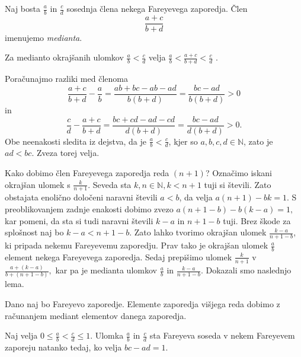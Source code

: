 \documentclass[mat1]{fmfdelo}
\begin{document}
%
\begin{definicija}
Naj bosta $\frac{a}{b}$ in $\frac{c}{d}$ sosednja člena nekega Fareyevega zaporedja. Člen \[\frac{a+c}{b+d} \] imenujemo \emph{medianta}.
\end{definicija}

\begin{trditev}
Za medianto okrajšanih ulomkov \(\frac{a}{b} < \frac{c}{d}\) velja  \(\frac{a}{b} < \frac{a+c}{b+d} < \frac{c}{d}\) .
\end{trditev}

\begin{dokaz}
Poračunajmo razliki med členoma
\[\frac{a+c}{b+d} - \frac{a}{b} = \frac{ab+bc-ab-ad}{b(b+d)} = \frac{bc-ad}{b(b+d)} > 0\] in
\[\frac{c}{d} - \frac{a+c}{b+d} = \frac{bc+cd-ad-cd}{d(b+d)} = \frac{bc-ad}{d(b+d)} > 0.\]
Obe neenakosti sledita iz dejstva, da je \(\frac{a}{b} < \frac{c}{d}\), kjer so \(a, b, c, d \in \mathbb{N} \), zato je \( ad < bc.\)
Zveza torej velja. 
\end{dokaz}

%
Kako dobimo člen Fareyevega zaporedja reda $(n+1)$?
Označimo iskani okrajšan ulomek s $\frac{k}{n+1}$. Seveda sta $k, n \in\mathbb{N}, k < n+1$ tuji si števili. Zato obstajata enolično določeni naravni števili $a < b$, da velja $a(n+1)-bk=1.$ S preoblikovanjem zadnje enakosti dobimo zvezo $a(n+1-b)-b(k-a)=1,$ kar pomeni, da sta si tudi naravni števili $k-a$ in $n+1-b$ tuji. Brez škode za splošnost naj bo $k-a<n+1-b.$ Zato lahko tvorimo okrajšan ulomek $\frac{k-a}{n+1-b}$, ki pripada nekemu Fareyevemu zaporedju. Prav tako je okrajšan ulomek $\frac{a}{b}$ element nekega Fareyevega zaporedja. Sedaj prepišimo ulomek $\frac{k}{n+1}$ v $\frac{a+(k-a)}{b+(n+1-b)},$ kar pa je medianta ulomkov $\frac{a}{b}$ in $\frac{k-a}{n+1-b}.$ Dokazali smo naslednjo lema.

\begin{lema}
\label{lema:EltVišReda}
Dano naj bo Fareyevo zaporedje. Elemente zaporedja višjega reda dobimo z računanjem mediant elementov danega zaporedja.
\end{lema}

\begin{trditev}
Naj velja \( 0 \leq \frac{a}{b} < \frac{c}{d} \leq 1\). Ulomka $\frac{a}{b}$ in $\frac{c}{d}$ sta Fareyeva soseda v nekem Fareyevem zaporeju natanko tedaj, ko velja \(bc - ad = 1\).
\end{trditev}
\end{document}
